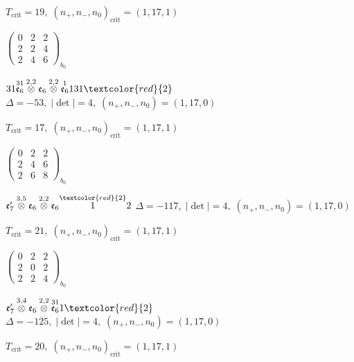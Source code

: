 \documentclass[10pt]{article}
\begin{document}
\hspace{1em}$T_{\text{crit}}=19,\; (n_+,n_-,n_0)_{\text{crit}}=(1,17,1)$

\hspace{2em}$\left(\begin{smallmatrix}0 & 2 & 2 \\ 2 & 2 & 4 \\ 2 & 4 & 6\end{smallmatrix}\right)_{\!b_0}$

$31\overset{31}{\mathfrak{e}_6}\overset{2,2}{\otimes}\mathfrak{e}_6\overset{2,2}{\otimes}\overset{1}{\mathfrak{e}_6}131\textcolor{red}{2}$ \quad $\Delta=-53,\; |\det|=4,\; (n_+,n_-,n_0)=(1,17,0)$

\hspace{1em}$T_{\text{crit}}=17,\; (n_+,n_-,n_0)_{\text{crit}}=(1,17,1)$

\hspace{2em}$\left(\begin{smallmatrix}0 & 2 & 2 \\ 2 & 4 & 6 \\ 2 & 6 & 8\end{smallmatrix}\right)_{\!b_0}$

\smallskip

$\mathfrak{e}_7'\overset{3,5}{\otimes}\mathfrak{e}_6\overset{2,2}{\otimes}\mathfrak{e}_6\overset{\textcolor{red}{2}}{1}2$ \quad $\Delta=-117,\; |\det|=4,\; (n_+,n_-,n_0)=(1,17,0)$

\hspace{1em}$T_{\text{crit}}=21,\; (n_+,n_-,n_0)_{\text{crit}}=(1,17,1)$

\hspace{2em}$\left(\begin{smallmatrix}0 & 2 & 2 \\ 2 & 0 & 2 \\ 2 & 2 & 4\end{smallmatrix}\right)_{\!b_0}$

\smallskip

$\mathfrak{e}_7'\overset{3,4}{\otimes}\mathfrak{e}_6\overset{2,2}{\otimes}\overset{31}{\mathfrak{e}_6}1\textcolor{red}{2}$ \quad $\Delta=-125,\; |\det|=4,\; (n_+,n_-,n_0)=(1,17,0)$

\hspace{1em}$T_{\text{crit}}=20,\; (n_+,n_-,n_0)_{\text{crit}}=(1,17,1)$
\end{document}
